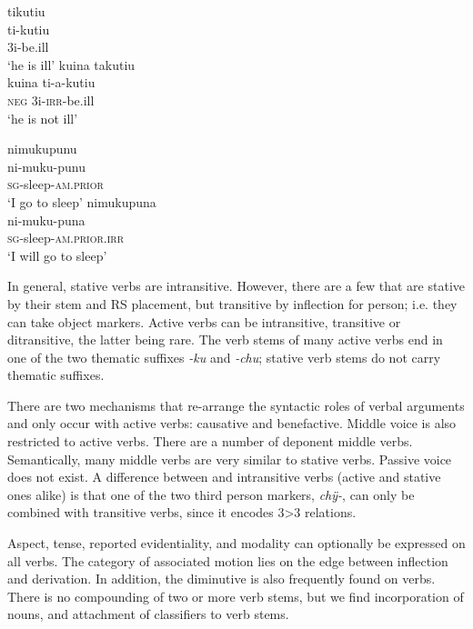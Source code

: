 \ea\label{ex:Stative}
  \ea\label{ex:Stative.1}
\begingl
\glpreamble tikutiu\\
\gla ti-kutiu\\
\glb 3i-be.ill\\
\glft ‘he is ill’
\endgl
  \ex\label{ex:Stative.2}
\begingl
\glpreamble kuina takutiu\\
\gla kuina ti-a-kutiu\\
\glb \textsc{neg} 3i-\textsc{irr}-be.ill\\
\glft ‘he is not ill’
\endgl
\z
\xe


\ea\label{ex:Active}
  \ea\label{ex:Active.1}
\begingl
\glpreamble  nimukupunu\\
\gla ni-muku-punu\\
\textsc{sg}-sleep-\textsc{am.prior}\\
\glft ‘I go to sleep’
\endgl
  \ex\label{ex:Active.2}
\begingl
\glpreamble nimukupuna\\
\gla ni-muku-puna\\
\textsc{sg}-sleep-\textsc{am.prior.irr}\\
\glft ‘I will go to sleep’
\endgl
\z
\xe
{}

In general, stative verbs are intransitive. However, there are a few that are stative by their stem and RS placement, but transitive by inflection for person; i.e. they can take object markers. Active verbs can be intransitive, transitive or ditransitive, the latter being rare. The verb stems of many active verbs end in one of the two thematic suffixes \textit{-ku} and \textit{-chu}; stative verb stems do not carry thematic suffixes.

There are two mechanisms that re-arrange the syntactic roles of verbal arguments and only occur with active verbs: causative and benefactive. Middle voice is also restricted to active verbs. There are a number of deponent middle verbs. Semantically, many middle verbs are very similar to stative verbs. Passive voice does not exist. A difference between  and intransitive verbs (active and stative ones alike) is that one of the two third person markers, \textit{chÿ-}, can only be combined with transitive verbs, since it encodes 3>3 relations.

Aspect, tense, reported evidentiality, and modality can optionally be expressed on all verbs. The category of associated motion lies on the edge between inflection and derivation. In addition, the diminutive is also frequently found on verbs. There is no compounding of two or more verb stems, but we find incorporation of nouns, and attachment of classifiers to verb stems.

